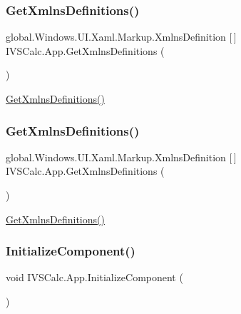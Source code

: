 \subsubsection{\texorpdfstring{Get\+Xmlns\+Definitions()}{GetXmlnsDefinitions()}\hspace{0.1cm}{\footnotesize\ttfamily [4/5]}}
{\footnotesize\ttfamily global.\+Windows.\+U\+I.\+Xaml.\+Markup.\+Xmlns\+Definition \mbox{[}$\,$\mbox{]} I\+V\+S\+Calc.\+App.\+Get\+Xmlns\+Definitions (\begin{DoxyParamCaption}{ }\end{DoxyParamCaption})}



\hyperlink{class_i_v_s_calc_1_1_app_a8f8ce062718726306de29d798b53bdba}{Get\+Xmlns\+Definitions()} 

\mbox{\label{class_i_v_s_calc_1_1_app_a8f8ce062718726306de29d798b53bdba}} 
\subsubsection{\texorpdfstring{Get\+Xmlns\+Definitions()}{GetXmlnsDefinitions()}\hspace{0.1cm}{\footnotesize\ttfamily [5/5]}}
{\footnotesize\ttfamily global.\+Windows.\+U\+I.\+Xaml.\+Markup.\+Xmlns\+Definition \mbox{[}$\,$\mbox{]} I\+V\+S\+Calc.\+App.\+Get\+Xmlns\+Definitions (\begin{DoxyParamCaption}{ }\end{DoxyParamCaption})}



\hyperlink{class_i_v_s_calc_1_1_app_a8f8ce062718726306de29d798b53bdba}{Get\+Xmlns\+Definitions()} 

\mbox{\label{class_i_v_s_calc_1_1_app_a52893841ad75312381695e5fae721452}} 
\subsubsection{\texorpdfstring{Initialize\+Component()}{InitializeComponent()}\hspace{0.1cm}{\footnotesize\ttfamily [1/5]}}
{\footnotesize\ttfamily void I\+V\+S\+Calc.\+App.\+Initialize\+Component (\begin{DoxyParamCaption}{ }\end{DoxyParamCaption})}



